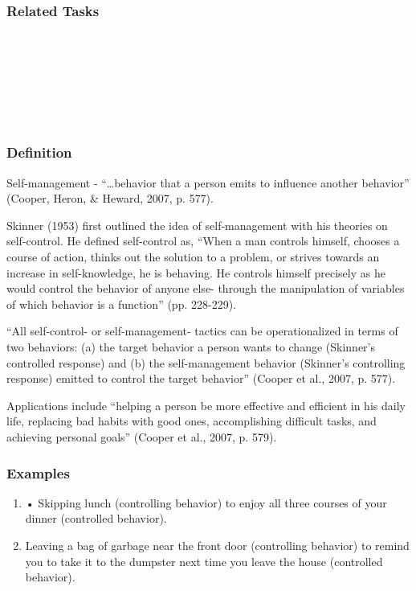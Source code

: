 \subsection{Related Tasks}
\fourdThree{}\\
\fourdEight{}\\
\foureTwo{}\\
\foureSix{}\\
\foureTwelve{}\\
%
%
%
%
%
%
%
%
%
%
%
%
%
%
\chapter{\foursecf{}}
\section{\fourfOne{}}
\subsection{Definition}
Self-management - ``…behavior that a person emits to influence another behavior'' (Cooper, Heron, \& Heward, 2007, p. 577).

Skinner (1953) first outlined the idea of self-management with his theories on self-control. He defined self-control as, ``When a man controls himself, chooses a course of action, thinks out the solution to a problem, or strives towards an increase in self-knowledge, he is behaving. He controls himself precisely as he would control the behavior of anyone else- through the manipulation of variables of which behavior is a function'' (pp. 228-229).

``All self-control- or self-management- tactics can be operationalized in terms of two behaviors: (a) the target behavior a person wants to change (Skinner's controlled response) and (b) the self-management behavior (Skinner's controlling response) emitted to control the target behavior'' (Cooper et al., 2007, p. 577).

Applications include ``helping a person be more effective and efficient in his daily life, replacing bad habits with good ones, accomplishing difficult tasks, and achieving personal goals'' (Cooper et al., 2007, p. 579).
%
\subsection{Examples}
\begin{enumerate}
\item     • Skipping lunch (controlling behavior) to enjoy all three courses of your dinner (controlled behavior).
\item Leaving a bag of garbage near the front door (controlling behavior) to remind you to take it to the dumpster next time you leave the house (controlled behavior).
%
\end{enumerate}
%
